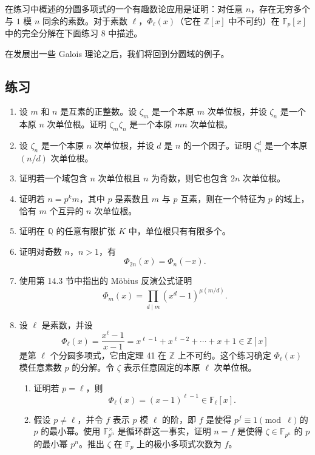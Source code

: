 在练习中概述的分圆多项式的一个有趣数论应用是证明：对任意 $n$，存在无穷多个与 $1$ 模 $n$ 同余的素数。对于素数 $\ell$，$\Phi_\ell(x)$（它在 $\mathbb Z[x]$ 中不可约）在 $\mathbb F_p[x]$ 中的完全分解在下面练习 8 中描述。

在发展出一些 Galois 理论之后，我们将回到分圆域的例子。

\subsection*{练习}

\begin{enumerate}[label=\arabic*.]
	 \item 设 $m$ 和 $n$ 是互素的正整数。设 $\zeta_m$ 是一个本原 $m$ 次单位根，并设 $\zeta_n$ 是一个本原 $n$ 次单位根。证明 $\zeta_m\zeta_n$ 是一个本原 $mn$ 次单位根。
	 
	 \item 设 $\zeta_n$ 是一个本原 $n$ 次单位根，并设 $d$ 是 $n$ 的一个因子。证明 $\zeta_n^d$ 是一个本原 $(n/d)$ 次单位根。
	 
	 \item 证明若一个域包含 $n$ 次单位根且 $n$ 为奇数，则它也包含 $2n$ 次单位根。
	 
	 \item 证明若 $n=p^km$，其中 $p$ 是素数且 $m$ 与 $p$ 互素，则在一个特征为 $p$ 的域上，恰有 $m$ 个互异的 $n$ 次单位根。
	 
	 \item 证明在 $\mathbb Q$ 的任意有限扩张 $K$ 中，单位根只有有限多个。
	 
	 \item 证明对奇数 $n$，$n>1$，有
	 \[
	 \Phi_{2n}(x)=\Phi_n(-x).
	 \]
	 
	 \item 使用第 14.3 节中指出的 Möbius 反演公式证明
	 \[
	 \Phi_m(x)=\prod_{d\mid m}(x^d-1)^{\mu(m/d)}.
	 \]
	 
	 \item 设 $\ell$ 是素数，并设
	 \[
	 \Phi_\ell(x)=\frac{x^\ell-1}{x-1}=x^{\ell-1}+x^{\ell-2}+\cdots+x+1\in\mathbb Z[x]
	 \]
	 是第 $\ell$ 个分圆多项式，它由定理 41 在 $\mathbb Z$ 上不可约。这个练习确定 $\Phi_\ell(x)$ 模任意素数 $p$ 的分解。令 $\zeta$ 表示任意固定的本原 $\ell$ 次单位根。
	 \begin{enumerate}[label=(\alph*)]
	 	\item 证明若 $p=\ell$，则
	 	\[
	 	\Phi_\ell(x)=(x-1)^{\ell-1}\in\mathbb F_\ell[x].
	 	\]
	 	
	 	\item 假设 $p\neq\ell$，并令 $f$ 表示 $p$ 模 $\ell$ 的阶，即 $f$ 是使得 $p^f\equiv1\pmod\ell$ 的 $p$ 的最小幂。使用 $\mathbb F_{p^n}^{\times}$ 是循环群这一事实，证明 $n=f$ 是使得 $\zeta\in\mathbb F_{p^n}$ 的 $p$ 的最小幂 $p^n$。推出 $\zeta$ 在 $\mathbb F_p$ 上的极小多项式次数为 $f$。
	 	

\end{enumerate}
\end{enumerate}
